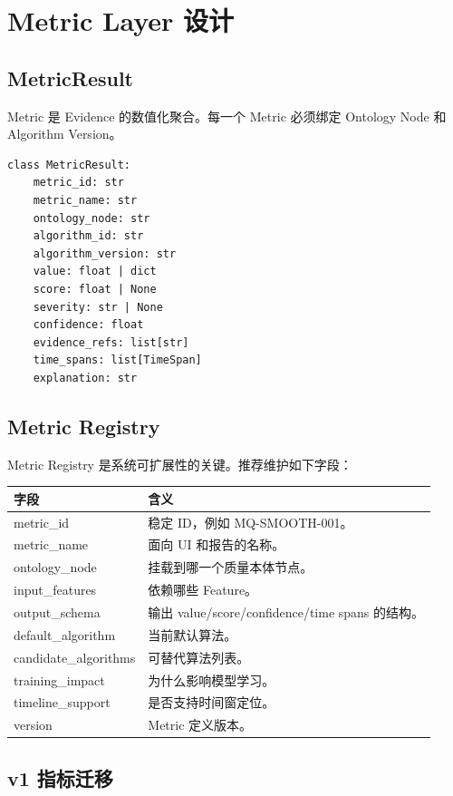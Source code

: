 \documentclass[UTF8,zihao=-4]{ctexart}
\begin{document}
\section{Metric Layer 设计}

\subsection{MetricResult}

Metric 是 Evidence 的数值化聚合。每一个 Metric 必须绑定 Ontology Node 和 Algorithm Version。

\begin{verbatim}
class MetricResult:
    metric_id: str
    metric_name: str
    ontology_node: str
    algorithm_id: str
    algorithm_version: str
    value: float | dict
    score: float | None
    severity: str | None
    confidence: float
    evidence_refs: list[str]
    time_spans: list[TimeSpan]
    explanation: str
\end{verbatim}

\subsection{Metric Registry}

Metric Registry 是系统可扩展性的关键。推荐维护如下字段：

\begin{longtable}{L{4cm} L{9.5cm}}
\toprule
字段 & 含义 \\
\midrule
metric\_id & 稳定 ID，例如 MQ-SMOOTH-001。 \\
metric\_name & 面向 UI 和报告的名称。 \\
ontology\_node & 挂载到哪一个质量本体节点。 \\
input\_features & 依赖哪些 Feature。 \\
output\_schema & 输出 value/score/confidence/time spans 的结构。 \\
default\_algorithm & 当前默认算法。 \\
candidate\_algorithms & 可替代算法列表。 \\
training\_impact & 为什么影响模型学习。 \\
timeline\_support & 是否支持时间窗定位。 \\
version & Metric 定义版本。 \\
\bottomrule
\end{longtable}

\subsection{v1 指标迁移}
\end{document}
